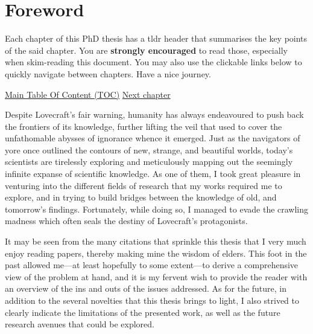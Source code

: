 \chapter{Foreword}\label{forechap:foreword}

\begin{tldrbox}
	Each chapter of this PhD thesis has a \gls{tldr} header that summarises the key points of the said chapter. You are \textbf{strongly encouraged} to read those, especially when skim-reading this document.  You may also use the clickable links below to quickly navigate between chapters. Have a nice journey.
	
	\tcblower
	
	 \hphantom{Previous chapter} \hfill \hyperref[chapter:toc]{Main Table Of Content (TOC)} \hfill \hyperref[forechap:ack]{Next chapter}
	
\end{tldrbox}


Despite Lovecraft's fair warning, humanity has always endeavoured to push back the frontiers of its knowledge, further lifting the veil that used to cover the unfathomable abysses of ignorance whence it emerged. Just as the navigators of yore once outlined the contours of new, strange, and beautiful worlds, today's scientists are tirelessly exploring and meticulously mapping out the seemingly infinite expanse of scientific knowledge. As one of them, I took great pleasure in venturing into the different fields of research that my works required me to explore, and in trying to build bridges between the knowledge of old, and tomorrow's findings. Fortunately, while doing so, I managed to evade the crawling madness which often seals the destiny of Lovecraft's protagonists.

It may be seen from the many citations that sprinkle this thesis that I very much enjoy reading papers, thereby making mine the wisdom of elders. This foot in the past allowed me---at least hopefully to some extent---to derive a comprehensive view of the problem at hand, and it is my fervent wish to provide the reader with an overview of the ins and outs of the issues addressed. As for the future, in addition to the several novelties that this thesis brings to light, I also strived to clearly indicate the limitations of the presented work, as well as the future research avenues that could be explored.

